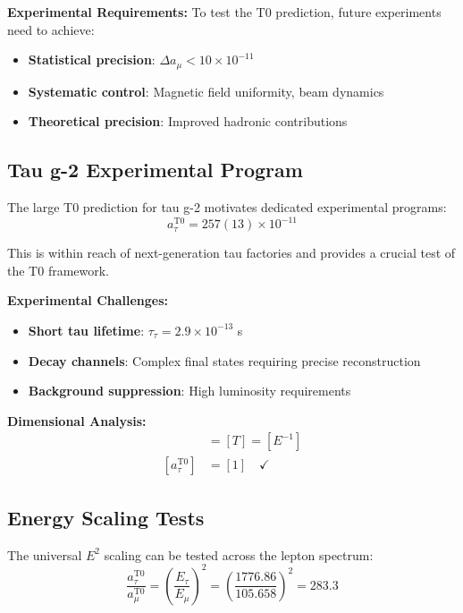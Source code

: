 \documentclass[12pt,a4paper]{report}
\begin{document}
	\textbf{Experimental Requirements:}
	To test the T0 prediction, future experiments need to achieve:
	\begin{itemize}
		\item \textbf{Statistical precision}: $\Delta a_\mu < 10 \times 10^{-11}$
		\item \textbf{Systematic control}: Magnetic field uniformity, beam dynamics
		\item \textbf{Theoretical precision}: Improved hadronic contributions
	\end{itemize}
	
	\subsection{Tau g-2 Experimental Program}
	\label{subsec:tau_g2_program}
	
	The large T0 prediction for tau g-2 motivates dedicated experimental programs:
	\begin{equation}
		a_\tau^{\text{T0}} = 257(13) \times 10^{-11}
	\end{equation}
	
	This is within reach of next-generation tau factories and provides a crucial test of the T0 framework.
	
	\textbf{Experimental Challenges:}
	\begin{itemize}
		\item \textbf{Short tau lifetime}: $\tau_\tau = 2.9 \times 10^{-13}$ s
		\item \textbf{Decay channels}: Complex final states requiring precise reconstruction
		\item \textbf{Background suppression}: High luminosity requirements
	\end{itemize}
	
	\textbf{Dimensional Analysis:}
	\begin{align}
		[\tau_\tau] &= [T] = [E^{-1}] \\
		[a_\tau^{\text{T0}}] &= [1] \quad \checkmark
	\end{align}
	
	\subsection{Energy Scaling Tests}
	\label{subsec:energy_scaling_tests}
	
	The universal $E^2$ scaling can be tested across the lepton spectrum:
	\begin{equation}
		\frac{a_\tau^{\text{T0}}}{a_\mu^{\text{T0}}} = \left(\frac{E_\tau}{E_\mu}\right)^2 = \left(\frac{1776.86}{105.658}\right)^2 = 283.3
	\end{equation}
	
\end{document}
